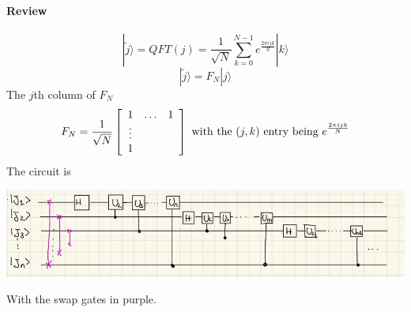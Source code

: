 \documentclass[10pt]{report}
\begin{document}
\paragraph{Review}
$$|\tilde{j}\rangle = QFT(j) = \frac{1}{\sqrt{N}}\sum_{k=0}^{N-1}e^{\frac{2\pi ijk}{N}}|k\rangle$$
$$|\tilde{j}\rangle = F_N|j\rangle$$
The $j$th column of $F_N$
$$F_N=\frac{1}{\sqrt{N}}\left[\begin{array}{c c c}
1&\ldots&1\\
\vdots& &\\
1
\end{array}\right]\hbox{ with the }(j,k)\hbox{ entry being }e^{\frac{2\pi ijk}{N}}$$
The circuit is
\begin{center}
	\includegraphics[scale=0.5]{26.png}
\end{center}
With the swap gates in purple.
\end{document}
